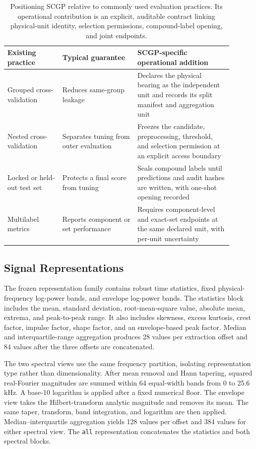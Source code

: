 \documentclass[machines,article,submit,oneauthor,pdftex]{Definitions/mdpi}
\begin{document}
\begin{table}[t]
\centering
\scriptsize
\setlength{\tabcolsep}{3pt}
\caption{Positioning SCGP relative to commonly used evaluation practices. Its operational contribution is an explicit, auditable contract linking physical-unit identity, selection permissions, compound-label opening, and joint endpoints.}
\label{tab:scgp-positioning}
\begin{tabular}{p{0.22\linewidth}p{0.30\linewidth}p{0.38\linewidth}}
\hline
Existing practice & Typical guarantee & SCGP-specific operational addition \\
\hline
Grouped cross-validation & Reduces same-group leakage & Declares the physical bearing as the independent unit and records its split manifest and aggregation unit \\
Nested cross-validation & Separates tuning from outer evaluation & Freezes the candidate, preprocessing, threshold, and selection permission at an explicit access boundary \\
Locked or held-out test set & Protects a final score from tuning & Seals compound labels until predictions and audit hashes are written, with one-shot opening recorded \\
Multilabel metrics & Reports component or set performance & Requires component-level and exact-set endpoints at the same declared unit, with per-unit uncertainty \\
\hline
\end{tabular}
\end{table}

\subsection{Signal Representations}

The frozen representation family contains robust time statistics, fixed physical-frequency log-power bands, and envelope log-power bands. The statistics block includes the mean, standard deviation, root-mean-square value, absolute mean, extrema, and peak-to-peak range. It also includes skewness, excess kurtosis, crest factor, impulse factor, shape factor, and an envelope-based peak factor. Median and interquartile-range aggregation produces 28 values per extraction offset and 84 values after the three offsets are concatenated.

The two spectral views use the same frequency partition, isolating representation type rather than dimensionality. After mean removal and Hann tapering, squared real-Fourier magnitudes are summed within 64 equal-width bands from 0 to 25.6 kHz. A base-10 logarithm is applied after a fixed numerical floor. The envelope view takes the Hilbert-transform analytic magnitude and removes its mean. The same taper, transform, band integration, and logarithm are then applied. Median--interquartile aggregation yields 128 values per offset and 384 values for either spectral view. The \texttt{all} representation concatenates the statistics and both spectral blocks.
\end{document}
